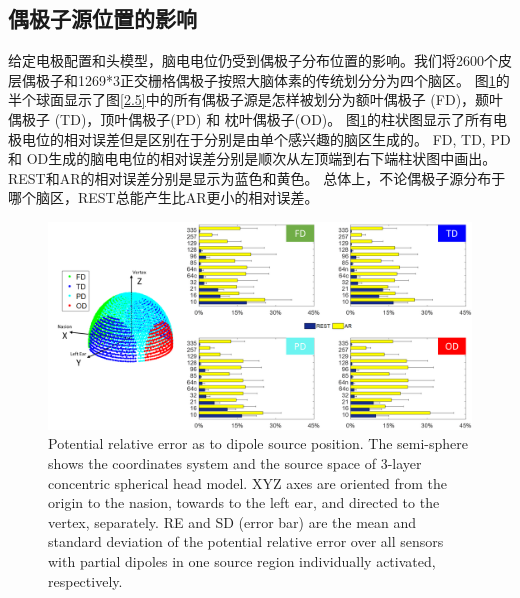 \subsection{偶极子源位置的影响}
给定电极配置和头模型，脑电电位仍受到偶极子分布位置的影响。我们将2600个皮层偶极子和1269*3正交栅格偶极子按照大脑体素的传统划分分为四个脑区。 
图\ref{2.6}的半个球面显示了图\ref{2.5}中的所有偶极子源是怎样被划分为额叶偶极子 (FD)，颞叶偶极子 (TD)，顶叶偶极子(PD) 和 枕叶偶极子(OD)。 图\ref{2.6}的柱状图显示了所有电极电位的相对误差但是区别在于分别是由单个感兴趣的脑区生成的。 FD, TD, PD 
和 OD生成的脑电电位的相对误差分别是顺次从左顶端到右下端柱状图中画出。REST和AR的相对误差分别是显示为蓝色和黄色。 总体上，不论偶极子源分布于哪个脑区，REST总能产生比AR更小的相对误差。
\begin{figure}[h!]
	\centering
	\includegraphics[width=15cm]{pic/JNE/figure6.png}
	\caption{Potential relative error as to dipole source position. The semi-sphere shows the coordinates system and the source space of 3-layer concentric spherical head model. XYZ axes are oriented from the origin to the nasion, towards to the left ear, and directed to the vertex, separately. RE and SD (error bar) are the mean and standard deviation of the potential relative error over all sensors with partial dipoles in one source region individually activated, respectively.}
	\label{2.6}
\end{figure}

